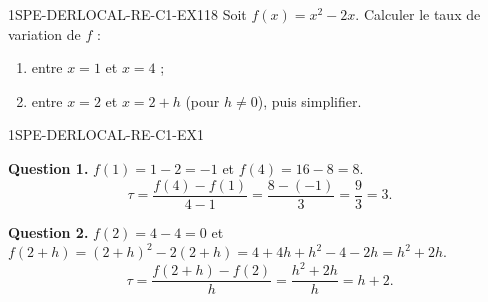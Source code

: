 

\begin{exercice}{1SPE-DERLOCAL-RE-C1-EX1}{1}{8}
Soit $f(x) = x^2 - 2x$. Calculer le taux de variation de $f$ :
\begin{enumerate}
  \item entre $x = 1$ et $x = 4$ ;
  \item entre $x = 2$ et $x = 2+h$ (pour $h
\neq 0$), puis simplifier.
\end{enumerate}
\end{exercice}



\begin{corrige}{1SPE-DERLOCAL-RE-C1-EX1}


\textbf{Question 1.}
$f(1) = 1 - 2 = -1$ et $f(4) = 16 - 8 = 8$.
\[
\tau = \frac{f(4)-f(1)}{4-1} = \frac{8-(-1)}{3} = \frac{9}{3} = 3.
\]

\textbf{Question 2.}
$f(2) = 4 - 4 = 0$ et $f(2+h) = (2+h)^2 - 2(2+h) = 4+4h+h^2-4-2h = h^2+2h$.
\[
\tau = \frac{f(2+h)-f(2)}{h} = \frac{h^2+2h}{h} = h+2.
\]

\end{corrige}


